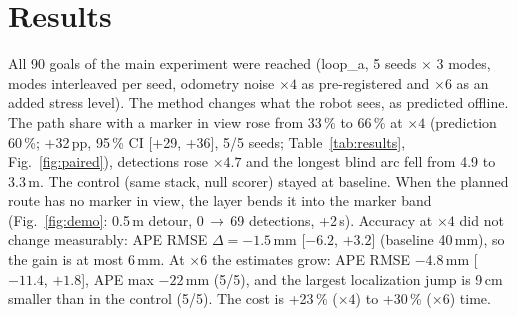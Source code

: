 \documentclass[10pt,twocolumn]{article}
\begin{document}
\section{Results}
All 90 goals of the main experiment were reached (loop\_a, 5 seeds $\times$ 3 modes, modes interleaved per seed, odometry noise ${\times}4$ as pre-registered and ${\times}6$ as an added stress level).
The method changes what the robot sees, as predicted offline. The path share with a marker in view rose from 33\,\% to 66\,\% at ${\times}4$ (prediction 60\,\%; +32\,pp, 95\,\% CI [+29, +36], 5/5 seeds; Table~\ref{tab:results}, Fig.~\ref{fig:paired}), detections rose ${\times}4.7$ and the longest blind arc fell from 4.9 to 3.3\,m.
The control (same stack, null scorer) stayed at baseline. When the planned route has no marker in view, the layer bends it into the marker band (Fig.~\ref{fig:demo}: 0.5\,m detour, 0\,$\to$\,69 detections, +2\,s).
Accuracy at ${\times}4$ did not change measurably: APE RMSE $\Delta=-1.5$\,mm [$-6.2$, $+3.2$] (baseline 40\,mm), so the gain is at most 6\,mm.
At ${\times}6$ the estimates grow: APE RMSE $-4.8$\,mm [$-11.4$, $+1.8$], APE max $-22$\,mm (5/5), and the largest localization jump is 9\,cm smaller than in the control (5/5). The cost is +23\,\% (${\times}4$) to +30\,\% (${\times}6$) time.

\end{document}

